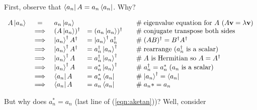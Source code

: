 \documentclass[11pt, oneside]{article}   	%
\begin{document}
\bigskip
\noindent

First, observe that $ \bra{a_n} A = a_n \bra{a_n}$. Why? 

\begin{equation}
\begin{array}{rcllll}
A \ket{a_n}
&=& a_n \ket{a_n}                                                                                                       && \quad \mathrel{\#} \text{eigenvalue equation for $A$ } (A \textbf{v} = \lambda \mathbf{v})  \\
&\implies& (A \ket{a_n})^{\dagger}               &= (a_n \ket{a_n})^{\dagger}                    & \quad \mathrel{\#} \text{conjugate transpose both sides} \\
&\implies& \ket{a_n}^{\dagger} A^{\dagger} &= \ket{a_n}^{\dagger} a_n^{\dagger}       & \quad \mathrel{\#} (AB)^\dagger = B^\dagger A^\dagger \\
&\implies& \ket{a_n}^{\dagger} A^{\dagger} &= a_n^{\dagger} \ket{a_n}^{\dagger}       & \quad \mathrel{\#} \text{rearrange ($a_n^\dagger$ is a scalar)} \\
&\implies& \ket{a_n}^{\dagger} A                 &= a_n^{\dagger} \ket{a_n}^{\dagger}       & \quad \mathrel{\#} \text{$A$ is Hermitian so $A = A^\dagger$} \\
&\implies& \ket{a_n}^{\dagger} A                 & = a_n^{*} \ket{a_n}^{\dagger}                 & \quad \mathrel{\#} a_n^{\dagger} = a_n^* \; \text{($a_n$ is a scalar)} \\
&\implies& \bra{a_n} A                                 &= a_n^{*} \bra{a_n}                                  & \quad \mathrel{\#} \ket{a_n}^{\dagger} = \bra{a_n} \\
&\implies& \bra{a_n} A                                 &= a_n  \bra{a_n}                                      & \quad \mathrel{\#} a_n* = a_n
\label{eqn:aketan}
\end{array}
\end{equation}

\bigskip
\noindent
But why does $a_n^* = a_n$ (last line of (\ref{eqn:aketan}))? Well, consider
\end{document}
